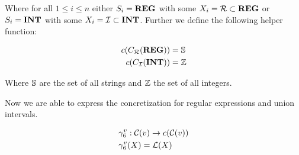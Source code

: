 Where for all $1 \leq i \leq n$ either $S_i = \mathbf{REG}$ with some $X_i = \mathcal{R} \subset \mathbf{REG}$ or $S_i = \mathbf{INT}$ with some $X_i = \mathcal{I} \subset \mathbf{INT}$.
Further we define the following helper function:


\begin{align}
    c(C_{\mathcal{R}}(\mathbf{REG})) &= \mathbb{S} \\
    c(C_{\mathcal{I}}(\mathbf{INT})) &= \mathbb{Z}
\end{align}


Where $\mathbb{S}$ are the set of all strings and $\mathbb{Z}$ the set of all integers.

Now we are able to express the concretization for regular expressions and union intervals.

\begin{align}
    &\gamma^v_6 : \mathcal{C}(v) \rightarrow c(\mathcal{C}(v)) \\
    &\gamma^v_6(X) = \mathcal{L}(X)
\end{align}

%


